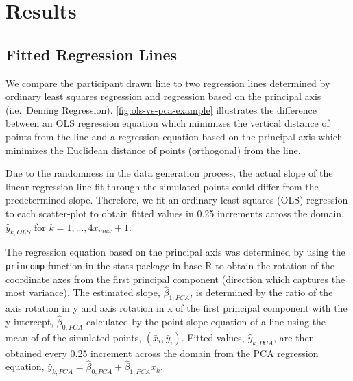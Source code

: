 \documentclass[12pt]{article}
\begin{document}
\hypertarget{results}{%
\section{Results}\label{results}}

\hypertarget{fitted-regression-lines}{%
\subsection{Fitted Regression Lines}\label{fitted-regression-lines}}

We compare the participant drawn line to two regression lines determined
by ordinary least squares regression and regression based on the
principal axis (i.e.~Deming Regression). \cref{fig:ols-vs-pca-example}
illustrates the difference between an OLS regression equation which
minimizes the vertical distance of points from the line and a regression
equation based on the principal axis which minimizes the Euclidean
distance of points (orthogonal) from the line.

Due to the randomness in the data generation process, the actual slope
of the linear regression line fit through the simulated points could
differ from the predetermined slope. Therefore, we fit an ordinary least
squares (OLS) regression to each scatter-plot to obtain fitted values in
0.25 increments across the domain, \(\hat y_{k,OLS}\) for
\(k = 1, ..., 4 x_{max} +1\).

The regression equation based on the principal axis was determined by
using the \texttt{princomp} function in the stats package in base R to
obtain the rotation of the coordinate axes from the first principal
component (direction which captures the most variance). The estimated
slope, \(\hat\beta_{1,PCA}\), is determined by the ratio of the axis
rotation in y and axis rotation in x of the first principal component
with the y-intercept, \(\hat\beta_{0,PCA}\) calculated by the
point-slope equation of a line using the mean of of the simulated
points, \((\bar x_i, \bar y_i)\). Fitted values, \(\hat y_{k,PCA}\), are
then obtained every 0.25 increment across the domain from the PCA
regression equation,
\(\hat y_{k,PCA} = \hat\beta_{0,PCA} + \hat\beta_{1,PCA} x_k\).
\end{document}
